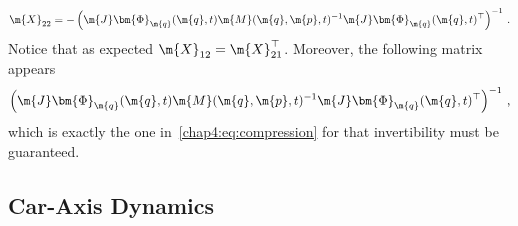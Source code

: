\begin{equation*}
  \m{X}_{22} = -\left(\m{J}\bm{\Phi}_{\m{q}}(\m{q}, t) \m{M}(\m{q}, \m{p}, t)^{-1}\m{J}\bm{\Phi}_{\m{q}}(\m{q}, t)^{\top}\right)^{-1} \, \text{.}
\end{equation*}
%
Notice that as expected $\m{X}_{12} = \m{X}_{21}^{\top}$. Moreover, the following matrix appears
%
\begin{equation*}
  \left(\m{J}\bm{\Phi}_{\m{q}}(\m{q}, t)\m{M}(\m{q}, \m{p}, t)^{-1} \m{J}\bm{\Phi}_{\m{q}}(\m{q}, t)^{\top}\right)^{-1} \, \text{,}
\end{equation*}
%
which is exactly the one in~\eqref{chap4:eq:compression} for that invertibility must be guaranteed.

\subsection{Car-Axis Dynamics}

